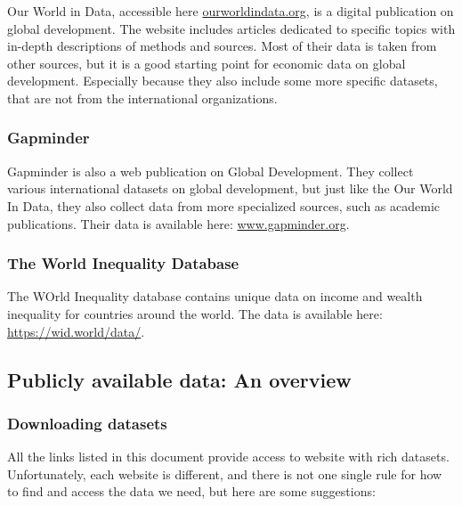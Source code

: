 \documentclass[]{book}
\begin{document}
Our World in Data, accessible here \href{http://www.ourworldindata.org}{ourworldindata.org}, is a digital publication on global development. The website includes articles dedicated to specific topics with in-depth descriptions of methods and sources. Most of their data is taken from other sources, but it is a good starting point for economic data on global development. Especially because they also include some more specific datasets, that are not from the international organizations.

\hypertarget{gapminder}{%
\subsubsection{Gapminder}\label{gapminder}}

Gapminder is also a web publication on Global Development. They collect various international datasets on global development, but just like the Our World In Data, they also collect data from more specialized sources, such as academic publications. Their data is available here:
\href{https://www.gapminder.org/data/}{www.gapminder.org}.

\hypertarget{the-world-inequality-database}{%
\subsubsection{The World Inequality Database}\label{the-world-inequality-database}}

The WOrld Inequality database contains unique data on income and wealth inequality for countries around the world. The data is available here: \href{https://wid.world/data}{https://wid.world/data/}.

\hypertarget{publicly-available-data-an-overview}{%
\subsection{Publicly available data: An overview}\label{publicly-available-data-an-overview}}

\hypertarget{downloading-datasets}{%
\subsubsection{Downloading datasets}\label{downloading-datasets}}

All the links listed in this document provide access to website with rich datasets. Unfortunately, each website is different, and there is not one single rule for how to find and access the data we need, but here are some suggestions:
\end{document}
